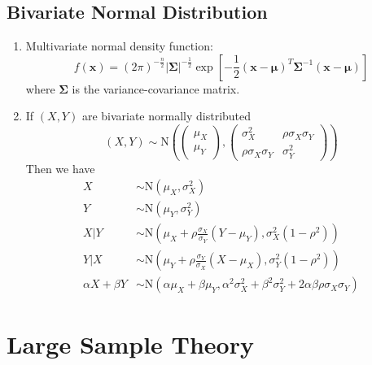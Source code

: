\documentclass[%
 aip,
 jmp,%
 amsmath,amssymb,
 reprint,%
]{revtex4-1}
\def\normal{\mathrm{N}}
\begin{document}
\subsection{Bivariate Normal Distribution}
\begin{enumerate}
  \item Multivariate normal density function:
  $$ f(\bm{x}) = (2\pi)^{-\frac{n}{2}}|\bm{\Sigma}|^{-\frac{1}{2}}
      \exp\left[-\frac{1}{2}(\bm{x}-\bm{\mu})^T \bm{\Sigma}^{-1}
      (\bm{x}-\bm{\mu})\right]
  $$
  where $\bm{\Sigma}$ is the variance-covariance matrix.


  \item If $(X,Y)$ are bivariate normally distributed
        \[ (X,Y) \sim \normal\left(
              \begin{pmatrix}
                \mu_X\\
                \mu_Y
              \end{pmatrix},
              \begin{pmatrix}
                \sigma_X^2            & \rho\sigma_X\sigma_Y \\
                \rho\sigma_X\sigma_Y  & \sigma_Y^2
              \end{pmatrix}
           \right)
        \]
        Then we have
        \begin{align*}
          X &\sim \normal(\mu_X, \sigma_X^2) \\
          Y &\sim \normal(\mu_Y, \sigma_Y^2) \\
          X|Y &\sim \normal\left(\mu_X + \rho\frac{\sigma_X}{\sigma_Y}(Y-\mu_Y), \sigma_X^2(1-\rho^2)\right) \\
          Y|X &\sim \normal\left(\mu_Y + \rho\frac{\sigma_Y}{\sigma_X}(X-\mu_X), \sigma_Y^2(1-\rho^2)\right) \\
          \alpha X + \beta Y &\sim \normal(\alpha\mu_X+\beta\mu_Y, \alpha^2\sigma_X^2 + \beta^2\sigma_Y^2 + 2\alpha\beta\rho\sigma_X\sigma_Y)
        \end{align*}


\end{enumerate}

\section{Large Sample Theory}
\end{document}
